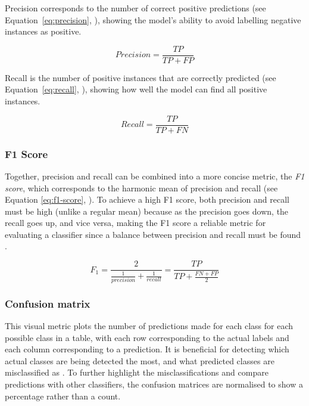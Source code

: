 Precision corresponds to the number of correct positive predictions (see Equation~\ref{eq:precision}, \cite{Liu2009}), showing the model's ability to avoid labelling negative instances as positive. 

\begin{equation}
\label{eq:precision}
    Precision = \frac{TP}{TP+FP}
\end{equation}

Recall is the number of positive instances that are correctly predicted (see Equation~\ref{eq:recall}, \cite{Liu2009}), showing how well the model can find all positive instances.

\begin{equation}
\label{eq:recall}
    Recall = \frac{TP}{TP+FN}
\end{equation}

\subsubsection{F1 Score}

Together, precision and recall can be combined into a more concise metric, the \textit{F1 score}, which corresponds to the harmonic mean of precision and recall (see Equation \ref{eq:f1-score}, \cite{Geron2019}). To achieve a high F1 score, both precision and recall must be high (unlike a regular mean) because as the precision goes down, the recall goes up, and vice versa, making the F1 score a reliable metric for evaluating a classifier since a balance between precision and recall must be found \citep{Geron2019}.

\begin{equation}
\label{eq:f1-score}
    F_{1} = \frac{2}{\frac{1}{precision} + \frac{1}{recall}} = \frac{TP}{TP+\frac{FN + FP}{2}}
\end{equation}

\subsubsection{Confusion matrix} 

This visual metric plots the number of predictions made for each class for each possible class in a table, with each row corresponding to the actual labels and each column corresponding to a prediction. It is beneficial for detecting which actual classes are being detected the most, and what predicted classes are misclassified as \citep{Bhardwaj2015, Liu2009}. To further highlight the misclassifications and compare predictions with other classifiers, the confusion matrices are normalised to show a percentage rather than a count.

